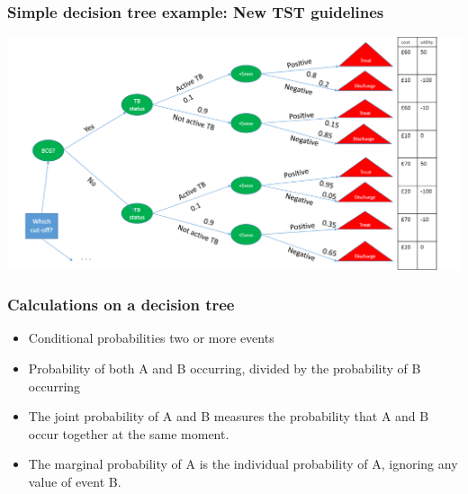\begin{frame}
\frametitle{Simple decision tree example: New TST guidelines}
 \includegraphics[width=\textwidth,height=0.8\textheight, keepaspectratio]{decision-trees/figs/tb-decision-tree}
\end{frame}


\begin{frame}
\frametitle{Calculations on a decision tree}

\begin{itemize}
 \item Conditional probabilities two or more events 
 \item Probability of both A and B occurring, divided by the probability of B occurring
 \item The joint probability of A and B measures the probability that A and B occur together at the same moment.
 \item The marginal probability of A is the individual probability of A, ignoring any value of event B.
\end{itemize}

\end{frame}

